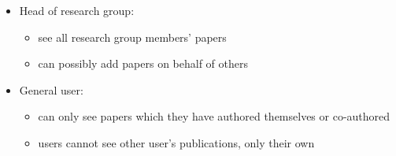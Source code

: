 \documentclass{article}
\begin{document}
\begin{itemize}
\begin{itemize}
\begin{itemize}
\begin{itemize}
				\end{itemize}
				\item Head of research group:
				\begin{itemize}
					\item see all research group members' papers
					\item can possibly add papers on behalf of others
				\end{itemize}
				\item General user:
				\begin{itemize}
					\item can only see papers which they have authored themselves or co-authored
					\item users cannot see other user's publications, only their own
				\end{itemize}
			\end{itemize}
		\end{itemize}
	\end{itemize}
\end{document}
